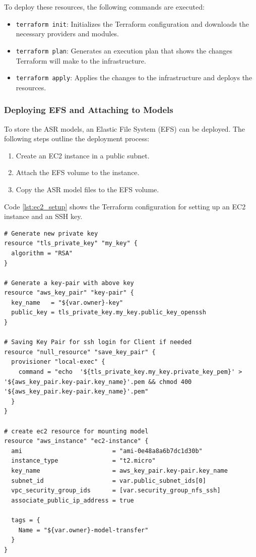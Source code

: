 To deploy these resources, the following commands are executed:
\begin{itemize}
    \item \texttt{terraform init}: Initializes the Terraform configuration and downloads the necessary providers and modules.
    \item \texttt{terraform plan}: Generates an execution plan that shows the changes Terraform will make to the infrastructure.
    \item \texttt{terraform apply}: Applies the changes to the infrastructure and deploys the resources.
\end{itemize}

\subsubsection{Deploying EFS and Attaching to Models}
To store the ASR models, an Elastic File System (EFS) can be deployed. The following steps outline the deployment process:
\begin{enumerate}
    \item Create an EC2 instance in a public subnet.
    \item Attach the EFS volume to the instance.
    \item Copy the ASR model files to the EFS volume.
\end{enumerate}


Code \ref{lst:ec2_setup} shows the Terraform configuration for setting up an EC2 instance and an SSH key. 

\begin{lstlisting}[caption={Terraform Configuration for Setting Up EC2 Instance}, label={lst:ec2_setup}]
# Generate new private key
resource "tls_private_key" "my_key" {
  algorithm = "RSA"
}

# Generate a key-pair with above key
resource "aws_key_pair" "key-pair" {
  key_name   = "${var.owner}-key"
  public_key = tls_private_key.my_key.public_key_openssh
}

# Saving Key Pair for ssh login for Client if needed
resource "null_resource" "save_key_pair" {
  provisioner "local-exec" {
    command = "echo  '${tls_private_key.my_key.private_key_pem}' > '${aws_key_pair.key-pair.key_name}'.pem && chmod 400 '${aws_key_pair.key-pair.key_name}'.pem"
  }
}

# create ec2 resource for mounting model
resource "aws_instance" "ec2-instance" {
  ami                         = "ami-0e48a8a6b7dc1d30b"
  instance_type               = "t2.micro"
  key_name                    = aws_key_pair.key-pair.key_name
  subnet_id                   = var.public_subnet_ids[0]
  vpc_security_group_ids      = [var.security_group_nfs_ssh]
  associate_public_ip_address = true

  tags = {
    Name = "${var.owner}-model-transfer"
  }
}
\end{lstlisting}

